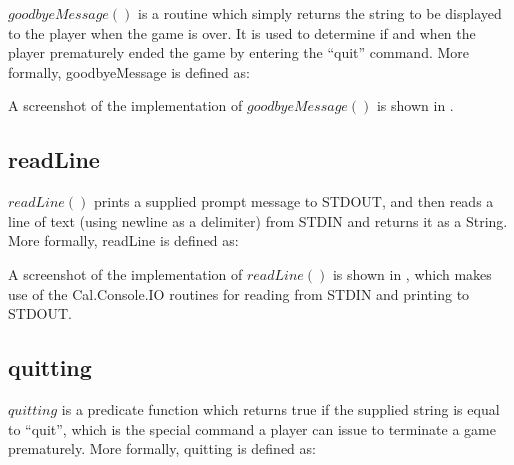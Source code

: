 \(goodbyeMessage()\) is a routine which simply returns the string to be displayed to the player when the game is over.  It is used to determine if and when the player prematurely ended the game by entering the ``quit'' command.  More formally, goodbyeMessage is defined as:


A screenshot of the implementation of \(goodbyeMessage()\) is shown in .


\subsection{readLine}

\(readLine()\) prints a supplied prompt message to STDOUT, and then reads a line of text (using newline as a delimiter) from STDIN and returns it as a String.  More formally, readLine is defined as:


A screenshot of the implementation of \(readLine()\) is shown in , which makes use of the Cal.Console.IO routines for reading from STDIN and printing to STDOUT.


\subsection{quitting}

\(quitting\) is a predicate function which returns true if the supplied string is equal to ``quit'', which is the special command a player can issue to terminate a game prematurely.  More formally, quitting is defined as:


